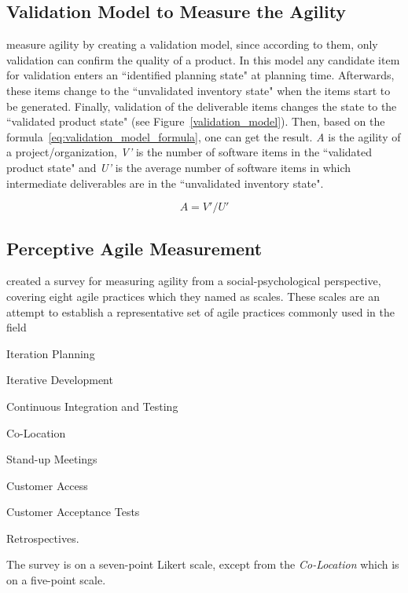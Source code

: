 \subsection{Validation Model to Measure the Agility}
\citet{validation_model} measure agility by creating a validation model, since according to them, only validation can confirm the quality of a product. In this model any candidate item for validation enters an ``identified planning state" at planning time. Afterwards, these items change to the ``unvalidated inventory state" when the items start to be generated. Finally, validation of the deliverable items changes the state to the ``validated product state" (see Figure~\ref{validation_model}). Then, based on the formula~\eqref{eq:validation_model_formula}, one can get the result. \textit{A} is the agility of a project/organization, \textit{V'} is the number of software items in the ``validated product state" and \textit{U'} is the average number of software items in which intermediate deliverables are in the ``unvalidated inventory state".

\begin{equation} \label{eq:validation_model_formula}  A = V'/U' \end{equation}

\subsection{Perceptive Agile Measurement}
\citet{pam} created a survey for measuring agility from a social-psychological perspective, covering eight agile practices which they named as scales. These scales are an attempt to establish a representative set of agile practices commonly used in the field

\begin{inparaenum} [a\upshape)]
\item Iteration Planning
\item Iterative Development
\item Continuous Integration and Testing
\item Co-Location
\item Stand-up Meetings
\item Customer Access
\item Customer Acceptance Tests
\item Retrospectives.
\end{inparaenum} The survey is on a seven-point Likert scale, except from the \textit{Co-Location} which is on a five-point scale.

